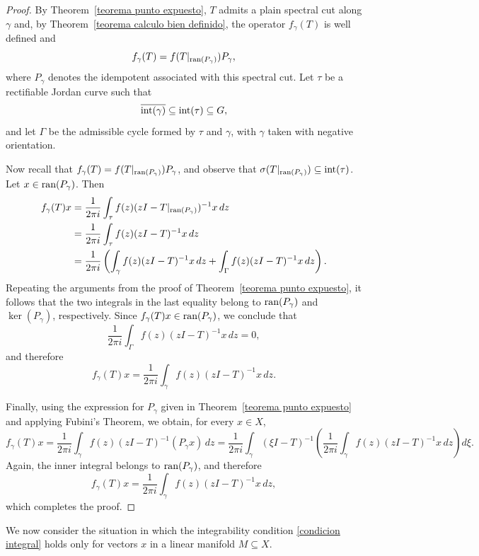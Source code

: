 \documentclass[11pt]{amsart}
\theoremstyle{definition}
\theoremstyle{remark}
\numberwithin{equation}{section}
\newcommand{\ran}{\textnormal{ran}}
\newcommand{\inte}{\textnormal{int}}
\begin{document}
\smallskip

\begin{proof}
By Theorem~\ref{teorema punto expuesto}, $T$ admits a plain spectral cut along $\gamma$ and, by Theorem~\ref{teorema calculo bien definido}, the operator $f_\gamma(T)$ is well defined and
$$
f_\gamma(T)=f(T|_{\ran(P_\gamma)})P_\gamma,
$$
where $P_\gamma$ denotes the idempotent associated with this spectral cut.
Let $\tau$ be a rectifiable Jordan curve such that
$$
\overline{\inte(\gamma)}\subseteq \inte(\tau)\subseteq G,
$$
and let $\Gamma$ be the admissible cycle formed by $\tau$ and $\gamma$, with $\gamma$ taken with negative orientation.

\smallskip
Now recall that $f_\gamma(T)=f(T|_{\ran(P_\gamma)})P_\gamma$, and observe that
$\sigma(T|_{\ran(P_\gamma)})\subseteq \inte(\tau)$. Let $x\in\ran(P_\gamma)$. Then
$$
\begin{aligned}
f_\gamma(T)x
&= \frac{1}{2\pi i}\int_\tau f(z)(zI-T|_{\ran(P_\gamma)})^{-1}x\,dz  \\
&= \frac{1}{2\pi i}\int_\tau f(z)(zI-T)^{-1}x\,dz  \\
&= \frac{1}{2\pi i}\left(
\int_\gamma f(z)(zI-T)^{-1}x\,dz
+
\int_\Gamma f(z)(zI-T)^{-1}x\,dz
\right).
\end{aligned}
$$
Repeating the arguments from the proof of Theorem~\ref{teorema punto expuesto}, it follows that the two integrals in the last equality belong to $\ran(P_\gamma)$ and $\ker(P_\gamma)$, respectively. Since $f_\gamma(T)x\in\ran(P_\gamma)$, we conclude that
$$
\frac{1}{2\pi i}\int_\Gamma f(z)(zI-T)^{-1}x\,dz=0,
$$
and therefore
$$
f_\gamma(T)x=\frac{1}{2\pi i}\int_\gamma f(z)(zI-T)^{-1}x\,dz .
$$

Finally, using the expression for $P_\gamma$ given in Theorem~\ref{teorema punto expuesto} and applying Fubini's Theorem, we obtain, for every $x\in X$,
$$
f_\gamma(T)x
= \frac{1}{2\pi i}\int_\gamma f(z)(zI-T)^{-1}(P_\gamma x)\,dz
= \frac{1}{2\pi i}\int_\gamma (\xi I-T)^{-1}\!\left(
\frac{1}{2\pi i}\int_\gamma f(z)(zI-T)^{-1}x\,dz
\right)d\xi .
$$
Again, the inner integral belongs to $\ran(P_\gamma)$, and therefore
$$
f_\gamma(T)x
= \frac{1}{2\pi i}\int_\gamma f(z)(zI-T)^{-1}x\,dz,
$$
which completes the proof.
\end{proof}

\smallskip

We now consider the situation in which the integrability condition \eqref{condicion integral} holds only for vectors $x$ in a linear manifold $M\subseteq X$.
\end{document}
